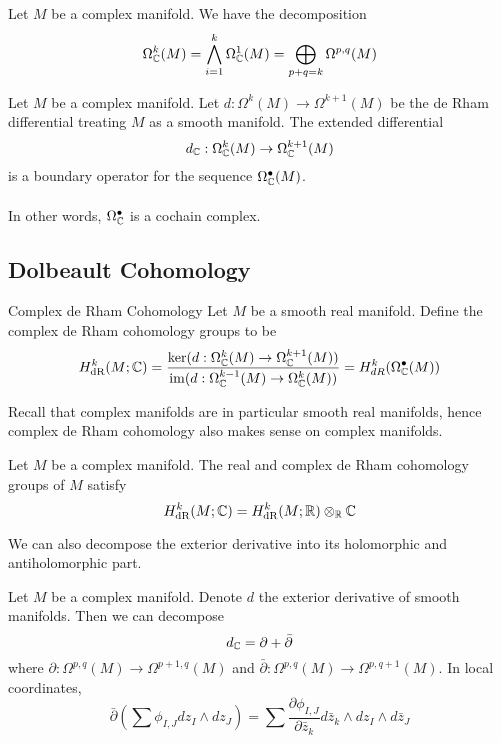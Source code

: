 \documentclass[a4paper]{article}
\begin{document}
\begin{lmm}{}{} Let $M$ be a complex manifold. We have the decomposition $$\Omega_{\mathbb{C}}^k(M)=\bigwedge_{i=1}^k\Omega_{\mathbb{C}}^1(M)=\bigoplus_{p+q=k}\Omega^{p,q}(M)$$
\end{lmm}

\begin{prp}{}{} Let $M$ be a complex manifold. Let $d:\Omega^k(M)\to\Omega^{k+1}(M)$ be the de Rham differential treating $M$ as a smooth manifold. The extended differential $$d_{\mathbb{C}}:\Omega_{\mathbb{C}}^k(M)\to\Omega_{\mathbb{C}}^{k+1}(M)$$ is a boundary operator for the sequence $\Omega_{\mathbb{C}}^\bullet(M)$. \\~\\
In other words, $\Omega_{\mathbb{C}}^\bullet$ is a cochain complex. 
\end{prp}

\subsection{Dolbeault Cohomology}
\begin{defn}{Complex de Rham Cohomology}{} Let $M$ be a smooth real manifold. Define the complex de Rham cohomology groups to be $$H_{\text{dR}}^k(M;\mathbb{C})=\frac{\ker(d:\Omega_{\mathbb{C}}^k(M)\to\Omega_{\mathbb{C}}^{k+1}(M))}{\operatorname{im}(d:\Omega_{\mathbb{C}}^{k-1}(M)\to\Omega_{\mathbb{C}}^k(M))}=H_{dR}^k(\Omega_{\mathbb{C}}^\bullet(M))$$
\end{defn}

Recall that complex manifolds are in particular smooth real manifolds, hence complex de Rham cohomology also makes sense on complex manifolds. 

\begin{prp}{}{} Let $M$ be a complex manifold. The real and complex de Rham cohomology groups of $M$ satisfy $$H_{\text{dR}}^k(M;\mathbb{C})=H_{\text{dR}}^k(M;\mathbb{R})\otimes_{\mathbb{R}}\mathbb{C}$$
\end{prp}

We can also decompose the exterior derivative into its holomorphic and antiholomorphic part. 

\begin{lmm}{}{} Let $M$ be a complex manifold. Denote $d$ the exterior derivative of smooth manifolds. Then we can decompose $$d_{\mathbb{C}}=\partial+\bar{\partial}$$ where $\partial:\Omega^{p,q}(M)\to\Omega^{p+1,q}(M)$ and $\bar{\partial}:\Omega^{p,q}(M)\to\Omega^{p,q+1}(M)$. In local coordinates, $$\bar{\partial}\left(\sum\phi_{I,J}dz_I\wedge dz_J\right)=\sum\frac{\partial \phi_{I,J}}{\partial \bar{z}_k}d\bar{z}_k\wedge dz_I\wedge d\bar{z}_J$$
\end{lmm}
\end{document}
